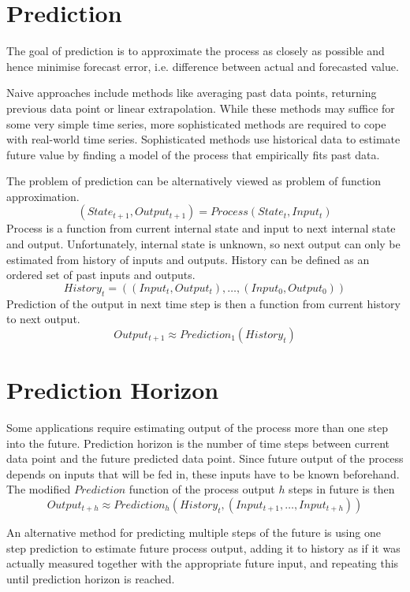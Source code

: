 \documentclass[12pt,oneside]{fithesis2}
\begin{document}
\section{Prediction}
The goal of prediction is to approximate the process as closely as possible and hence minimise forecast error, i.e. difference between actual and forecasted value. \par
Naive approaches include methods like averaging past data points, returning previous data point or linear extrapolation. While these methods may suffice for some very simple time series, more sophisticated methods are required to cope with real-world time series. Sophisticated methods use historical data to estimate future value by finding a model of the process that empirically fits past data. \par
The problem of prediction can be alternatively viewed as problem of function approximation.
	$$\left(State_{t+1}, Output_{t+1}\right) = Process(State_t, Input_t)$$
Process is a function from current internal state and input to next internal state and output. Unfortunately, internal state is unknown, so next output can only be estimated from history of inputs and outputs. History can be defined as an ordered set of past inputs and outputs.
	$$History_t = \left( (Input_{t}, Output_{t}), \dots, (Input_{0}, Output_{0}) \right)$$
Prediction of the output in next time step is then a function from current history to next output.
	$$Output_{t+1} \approx Prediction_{1}( History_t )$$

\section{Prediction Horizon}
Some applications require estimating output of the process more than one step into the future. Prediction horizon is the number of time steps between current data point and the future predicted data point. Since future output of the process depends on inputs that will be fed in, these inputs have to be known beforehand. The modified $Prediction$ function of the process output $h$ steps in future is then
	$$Output_{t+h} \approx Prediction_{h}( History_t, (Input_{t+1}, \dots, Input_{t+h}) )$$

An alternative method for predicting multiple steps of the future is using one step prediction to estimate future process output, adding it to history as if it was actually measured together with the appropriate future input, and repeating this until prediction horizon is reached.
\end{document}

